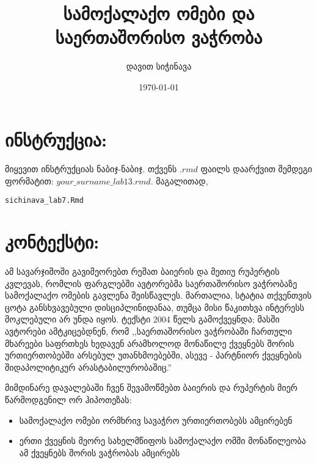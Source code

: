 \documentclass{article}\usepackage[]{graphicx}\usepackage[]{color}
\title{სამოქალაქო ომები და საერთაშორისო ვაჭრობა}
\author{დავით სიჭინავა}
\date{\today}
\makeatletter
\newcommand{\hlstd}[1]{\textcolor[rgb]{0.345,0.345,0.345}{#1}}%
\newenvironment{kframe}{%
 \def\at@end@of@kframe{}%
 \ifinner\ifhmode%
  \def\at@end@of@kframe{\end{minipage}}%
  \begin{minipage}{\columnwidth}%
 \fi\fi%
 \def\FrameCommand##1{\hskip\@totalleftmargin \hskip-\fboxsep
 \colorbox{shadecolor}{##1}\hskip-\fboxsep
     \hskip-\linewidth \hskip-\@totalleftmargin \hskip\columnwidth}%
 \MakeFramed {\advance\hsize-\width
   \@totalleftmargin\z@ \linewidth\hsize
   \@setminipage}}%
 {\par\unskip\endMakeFramed%
 \at@end@of@kframe}
\newenvironment{knitrout}{}{} %
\makeatother
\begin{document}
\maketitle

\section*{ინსტრუქცია:}

\paragraph{}

მიყევით ინსტრუქციას ნაბიჯ-ნაბიჯ. თქვენს $.rmd$ ფაილს დაარქვით შემდეგი ფორმატით: $your\_surname\_lab13.rmd$. მაგალითად,

\begin{knitrout}
\color{fgcolor}\begin{kframe}
\begin{alltt}
\hlstd{sichinava_lab7.Rmd}
\end{alltt}
\end{kframe}
\end{knitrout}

\section*{კონტექსტი:}
\paragraph{}

ამ სავარჯიშოში გავიმეორებთ რეშათ ბაიერის და მეთიუ რუპერტის კვლევას, რომლის ფარგლებში ავტორებმა საერთაშორისო ვაჭრობაზე სამოქალაქო ომების გავლენა შეისწავლეს. მართალია, სტატია თქვენთვის ცოტა განსხვავებული დისციპლინიდანაა, თუმცა მისი წაკითხვა ინტერესს მოკლებული არ უნდა იყოს. ტექსტი 2004 წელს გამოქვეყნდა; მასში ავტორები ამტკიცებდნენ, რომ ,,საერთაშორისო ვაჭრობაში ჩართული მხარეები საფრთხეს ხედავენ არამხოლოდ მონაწილე ქვეყნებს შორის ურთიერთობებში არსებულ უთანხმოებებში, ასევე - პარტნიორ ქვეყნების შიდაპოლიტიკურ არასტაბილურობაშიც.''

მიმდინარე დავალებაში ჩვენ შევამოწმებთ ბაიერის და რუპერტის მიერ წარმოდგენილ ორ ჰიპოთეზას:

\begin{itemize}
\item{სამოქალაქო ომები ორმხრივ სავაჭრო ურთიერთობებს ამცირებენ}
\item{ერთი ქვეყნის მეორე სახელმწიფოს სამოქალაქო ომში მონაწილეობა ამ ქვეყნებს შორის ვაჭრობას ამცირებს}
\end{itemize}
\end{document}
